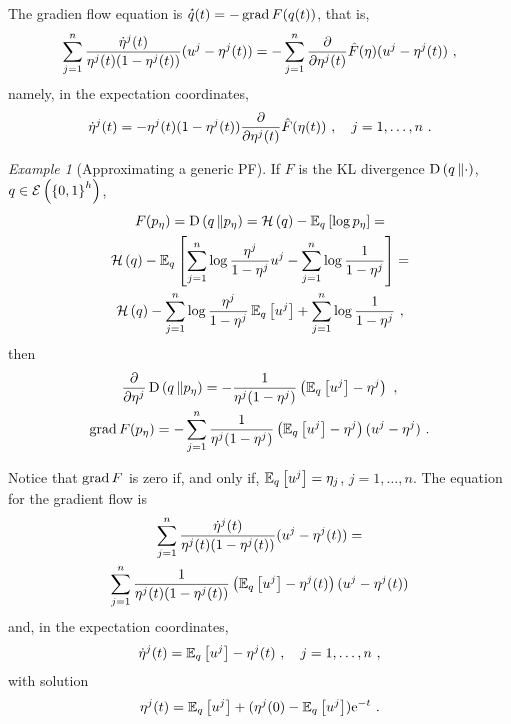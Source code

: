 \documentclass[12pt,a4paper]{amsart}
\theoremstyle{remark}
\newtheorem{example}{Example}
\begin{document}
The gradien flow equation is $\accentset{\star}{q}(t) = - \operatorname{grad} F(q(t))$, that is,
\begin{equation}
  \label{eq:61}
  \sum_{j=1}^n \frac {\dot\eta^j(t)}{\eta^j(t)(1-\eta^j(t))}(u^j - \eta^j(t)) = - \sum_{j=1}^n \frac {\partial} {\partial \eta^j(t)} \hat F(\eta) (u^j - \eta^j(t)) \ ,
\end{equation}
namely, in the expectation coordinates,
\begin{equation}
  \label{eq:62}
  \dot \eta^j(t) = - \eta^j(t)(1-\eta^j(t))\frac {\partial} {\partial \eta^j(t)} \hat F(\eta(t)) \ , \quad j=1,\dots,n \ .
\end{equation}

\begin{example}[Approximating a generic PF]  If $F$ is the KL divergence $\operatorname{D}\left(q\,\Vert\cdot\right)$, $q \in \operatorname{\mathcal E}\left(\left\{0,1\right\}^h\right)$,
\begin{multline}
  \label{eq:59}
  F(p_\eta) = \operatorname{D}\left(q\,\Vert p_\eta\right) = \operatorname{\mathcal H}\left(q\right) - \operatorname{\mathbb E}_{q}\left[\log p_\eta\right] = \\ \operatorname{\mathcal H}\left(q\right) - \operatorname{\mathbb E}_{q}\left[\sum_{j=1}^n \log \frac{\eta^j}{1-\eta^j} u^j - \sum_{j=1}^n \log \frac 1 {1 - \eta^j}\right] = \\ \operatorname{\mathcal H}\left(q\right) - \sum_{j=1}^n \log \frac{\eta^j}{1-\eta^j} \operatorname{\mathbb E}_{q}\left[u^j\right]  + \sum_{j=1}^n \log \frac 1 {1 - \eta^j} \ ,
\end{multline}
then
\begin{gather}
  \label{eq:60}
  \frac {\partial} {\partial \eta^j} \operatorname{D}\left(q\,\Vert p_\eta\right) =  - \frac 1 {\eta^j(1-\eta^j)}\left(\operatorname{\mathbb E}_{q}\left[u^j\right] - \eta^j\right) \ , \\
  \label{eq:60b}
  \operatorname{grad} F(p_\eta) = - \sum_{j=1}^n\frac1{\eta^j(1-\eta^j)}\left(\operatorname{\mathbb E}_{q}\left[u^j\right] - \eta^j\right)(u^j - \eta^j) \ .
\end{gather}

Notice that $\operatorname{grad} F$ is zero if, and only if, $\operatorname{\mathbb E}_{q}\left[u^j\right] = \eta_j$, $j = 1,\dots,n$. The equation for the gradient flow is
\begin{multline}
  \label{eq:56}
  \sum_{j=1}^n \frac {\dot\eta^j(t)}{\eta^j(t)(1-\eta^j(t))}(u^j - \eta^j(t)) = \\ 
  \sum_{j=1}^n\frac1{\eta^j(t)(1-\eta^j(t))}\left(\operatorname{\mathbb E}_{q}\left[u^j\right] - \eta^j(t)\right)(u^j - \eta^j(t))
\end{multline}
and, in the expectation coordinates,
\begin{equation}
  \label{eq:57}
\dot\eta^j(t) = \expectat q {u^j} - \eta^j(t) \ , \quad j=1,\dots,n \ ,   
\end{equation}
with solution
\begin{equation}
  \label{eq:63}
  \eta^j(t) = \operatorname{\mathbb E}_{q}\left[u^j\right] + (\eta^j(0) - \operatorname{\mathbb E}_{q}\left[u^j\right]) \mathrm{e}^{-t} \ .
\end{equation}
\end{example}
\end{document}
